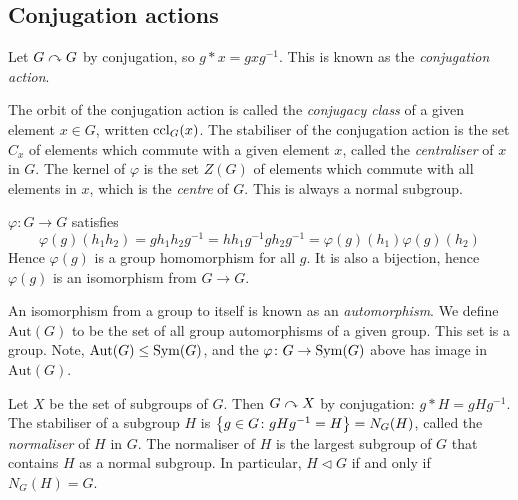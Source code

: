 \subsection{Conjugation actions}
\begin{example}
	Let \( G \curvearrowright G \) by conjugation, so \( g \ast x = g x g^{-1} \).
	This is known as the \textit{conjugation action}.
\end{example}
\begin{definition}
	The orbit of the conjugation action is called the \textit{conjugacy class} of a given element \( x \in G \), written \( \operatorname{ccl}_G(x) \).
	The stabiliser of the conjugation action is the set \( C_x \) of elements which commute with a given element \( x \), called the \textit{centraliser} of \( x \) in \( G \).
	The kernel of \( \varphi \) is the set \( Z(G) \) of elements which commute with all elements in \( x \), which is the \textit{centre} of \( G \).
	This is always a normal subgroup.
\end{definition}
\begin{remark}
	\( \varphi \colon G \to G \) satisfies
	\[
		\varphi(g)(h_1 h_2) = g h_1 h_2 g^{-1} = h h_1 g^{-1} g h_2 g^{-1} = \varphi(g)(h_1) \varphi(g)(h_2)
	\]
	Hence \( \varphi(g) \) is a group homomorphism for all \( g \).
	It is also a bijection, hence \( \varphi(g) \) is an isomorphism from \( G \to G \).
\end{remark}
\begin{definition}
	An isomorphism from a group to itself is known as an \textit{automorphism}.
	We define \( \mathrm{Aut}(G) \) to be the set of all group automorphisms of a given group.
	This set is a group.
	Note, \( \mathrm{Aut}(G) \leq \operatorname{Sym}(G) \), and the \( \varphi \colon G \to \operatorname{Sym}(G) \) above has image in \( \mathrm{Aut}(G) \).
\end{definition}
\begin{example}
	Let \( X \) be the set of subgroups of \( G \).
	Then \( G \curvearrowright X \) by conjugation: \( g \ast H = g H g^{-1} \).
	The stabiliser of a subgroup \( H \) is \( \qty{ g \in G \colon gHg^{-1} = H } = N_G(H) \), called the \textit{normaliser} of \( H \) in \( G \).
	The normaliser of \( H \) is the largest subgroup of \( G \) that contains \( H \) as a normal subgroup.
	In particular, \( H \triangleleft G \) if and only if \( N_G(H) = G \).
\end{example}
